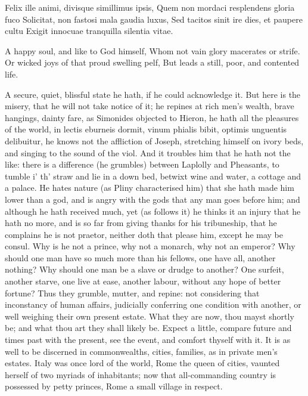 {Felix ille animi, divisque simillimus ipsis,
Quem non mordaci resplendens gloria fuco
Solicitat, non fastosi mala gaudia luxus,
Sed tacitos sinit ire dies, et paupere cultu
 Exigit innocuae tranquilla silentia vitae.

A happy soul, and like to God himself,
Whom not vain glory macerates or strife.
Or wicked joys of that proud swelling pelf,
But leads a still, poor, and contented life.

A secure, quiet, blissful state he hath, if he could acknowledge it.
But here is the misery, that he will not take notice of it; he repines
at rich men's wealth, brave hangings, dainty fare, as Simonides
objected to Hieron, he hath all the pleasures of the world, in
lectis eburneis dormit, vinum phialis bibit, optimis unguentis
delibuitur, he knows not the affliction of Joseph, stretching himself
on ivory beds, and singing to the sound of the viol. And it troubles
him that he hath not the like: there is a difference (he grumbles)
between Laplolly and Pheasants, to tumble i' th' straw and lie in a
down bed, betwixt wine and water, a cottage and a palace. He hates
nature (as Pliny characterised him) that she hath made him lower
than a god, and is angry with the gods that any man goes before him;
and although he hath received much, yet (as \Seneca follows it) he
thinks it an injury that he hath no more, and is so far from giving
thanks for his tribuneship, that he complains he is not praetor,
neither doth that please him, except he may be consul. Why is he not a
prince, why not a monarch, why not an emperor? Why should one man have
so much more than his fellows, one have all, another nothing? Why
should one man be a slave or drudge to another? One surfeit, another
starve, one live at ease, another labour, without any hope of better
fortune? Thus they grumble, mutter, and repine: not considering that
inconstancy of human affairs, judicially conferring one condition with
another, or well weighing their own present estate. What they are now,
thou mayst shortly be; and what thou art they shall likely be. Expect a
little, compare future and times past with the present, see the event,
and comfort thyself with it. It is as well to be discerned in
commonwealths, cities, families, as in private men's estates. Italy was
once lord of the world, Rome the queen of cities, vaunted herself of
two myriads of inhabitants; now that all-commanding country is
possessed by petty princes, Rome a small village in respect.

}

